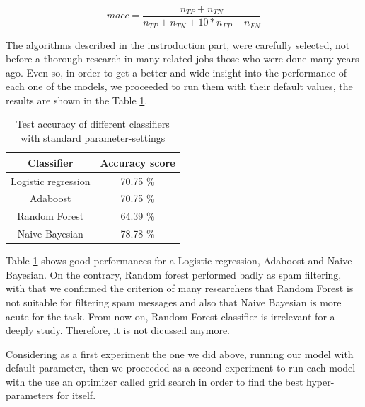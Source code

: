 \documentclass[journal]{IEEEtran}
\begin{document}
$$macc=\frac{n_{TP}+n_{TN}}{n_{TP}+n_{TN}+10*n_{FP}+n_{FN}}$$

The algorithms described in the instroduction part, were carefully selected, not before a thorough research in many related jobs those who were done many years ago. Even so, in order to get a better and wide insight into the performance of each one of the models, we proceeded to run them with their default values, the results are shown in the Table \ref{modifiedaccuracy}. 

\begin{table}[ht]
\renewcommand{\arraystretch}{1.3}
\centering
\begin{tabular}{|c|c|}
\hline
Classifier & Accuracy score\\
\hline
Logistic regression & 70.75 \%\\
\hline
Adaboost & 70.75 \%\\
\hline
Random Forest & 64.39 \%\\
\hline
Naive Bayesian & 78.78 \% \\
\hline
\end{tabular}

\caption{Test accuracy of different classifiers with standard parameter-settings}
\label{modifiedaccuracy}
\end{table}

Table \ref{modifiedaccuracy} shows good performances for a Logistic regression, Adaboost and Naive Bayesian. On the contrary, Random forest performed badly as spam filtering, with that we confirmed the criterion of many researchers that Random Forest is not suitable for filtering spam messages and also that Naive Bayesian is more acute for the task. From now on, Random Forest classifier is irrelevant for a deeply study. Therefore, it is not dicussed anymore.

Considering as a first experiment the one we did above, running our model with default parameter, then we proceeded as a second experiment to run each model with the use an optimizer called grid search in order to find the best hyper-parameters for itself.
\end{document}
